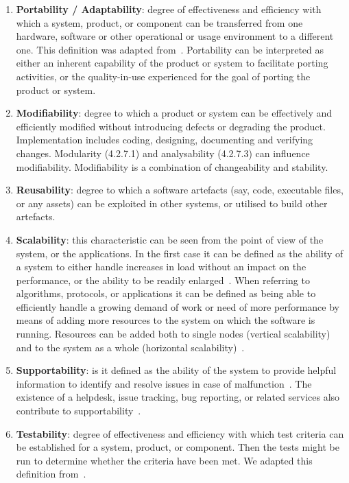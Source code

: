 \begin{enumerate}
    \item \textbf{Portability / Adaptability}: degree of effectiveness and efficiency with which a system, product, or component can be transferred from one hardware, software or other operational or usage environment to a different one. This definition was adapted from~\cite{iso_central_secretary_isoiecieee_2010}. Portability can be interpreted as either an inherent capability of the product or system to facilitate porting activities, or the quality-in-use experienced for the goal of porting the product or system.

    \item \textbf{Modifiability}: degree to which a product or system can be effectively and efficiently modified without introducing defects or degrading the product. Implementation includes coding, designing, documenting and verifying changes. Modularity (4.2.7.1) and analysability (4.2.7.3) can influence modifiability. Modifiability is a combination of changeability and stability. 

    \item \textbf{Reusability}: degree to which a software artefacts (say, code, executable files, or any assets) can be exploited in other systems, or utilised to build other artefacts.

    \item \textbf{Scalability}: this characteristic can be seen from the point of view of the system, or the applications. In the first case it can be defined as the ability of a system to either handle increases in load without an impact on the performance, or the ability to be readily enlarged~\cite{microsoft_2010}. When referring to algorithms, protocols, or applications it can be defined as being able to efficiently handle a growing demand of work or need of more performance by means of adding more resources to the system on which the software is running. Resources can be added both to single nodes (vertical scalability) and to the system as a whole (horizontal scalability)~\cite{bondi_2000}.

    \item \textbf{Supportability}: is it defined as the ability of the system to provide helpful information  to identify and resolve issues in case of malfunction~\cite{microsoft_2010}. The existence of a helpdesk,  issue tracking, bug reporting, or related services also contribute to supportability~\cite{orviz_fernandez_eosc-synergy_2020}.

    \item \textbf{Testability}: degree of effectiveness and efficiency with which test criteria can be established for a system, product, or component. Then the tests might be run to determine whether the criteria have been met. We adapted this definition from~\cite{iso_central_secretary_isoiecieee_2010}.
\end{enumerate}


